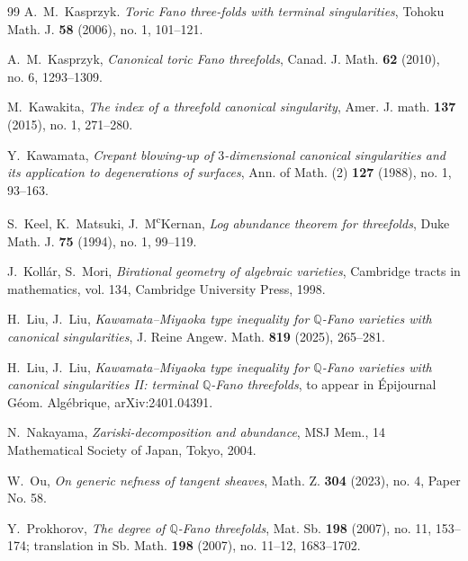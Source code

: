 \documentclass[12pt,twoside]{amsart}
\theoremstyle{definition}
\begin{document}
\begin{thebibliography}{99}
A.~M.~Kasprzyk. 
\emph{Toric Fano three-folds with terminal singularities},
Tohoku Math. J. \textbf{58} (2006), no. 1, 101--121.

A.~M.~Kasprzyk, 
\emph{Canonical toric Fano threefolds},
Canad. J. Math. \textbf{62} (2010), no. 6, 1293--1309.

M.~Kawakita, 
\emph{The index of a threefold canonical singularity},
Amer. J. math. \textbf{137} (2015), no. 1, 271--280.



Y.~Kawamata, 
{\it Crepant blowing-up of $3$-dimensional canonical singularities and its application to degenerations of surfaces}, 
Ann. of Math. (2) {\bf 127} (1988), no. 1, 93--163.


S.~Keel, K.~Matsuki, J.~M\textsuperscript{c}Kernan, 
{\it Log abundance theorem for threefolds},
Duke Math. J. {\bf 75} (1994), no. 1, 99--119.




J.~Koll\'{a}r, S.~Mori, 
\emph{Birational geometry of algebraic varieties},
Cambridge tracts in mathematics, vol. 134, Cambridge University
Press, 1998.

H.~Liu, J.~Liu, 
\emph{Kawamata--Miyaoka type inequality for $\mathbb Q$-Fano varieties with canonical singularities},
J. Reine Angew. Math. \textbf{819} (2025), 265--281.

H.~Liu, J.~Liu, 
\emph{Kawamata--Miyaoka type inequality for $\mathbb Q$-Fano varieties with canonical singularities II: terminal $\mathbb Q$-Fano threefolds},
to appear in \'Epijournal G\'eom. Alg\'ebrique, arXiv:2401.04391.

 N.~Nakayama,
{\it Zariski-decomposition and abundance},
MSJ Mem., 14
Mathematical Society of Japan, Tokyo, 2004.

W.~Ou, 
\emph{On generic nefness of tangent sheaves}, 
Math. Z. \textbf{304} (2023), no. 4, Paper No. 58.

Y.~Prokhorov, 
\emph{The degree of $\mathbb Q$-Fano threefolds}, 
Mat. Sb. \textbf{198} (2007), no. 11, 153--174; translation in Sb. Math. \textbf{198} (2007), no. 11--12, 1683--1702.


\end{thebibliography}
\end{document}
